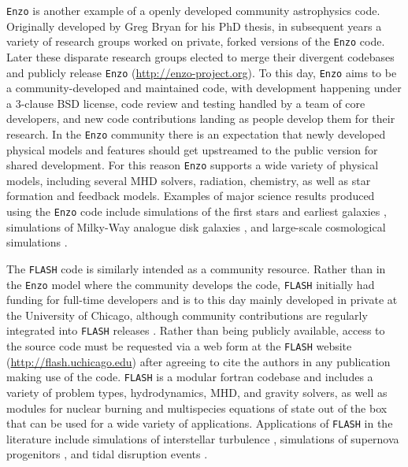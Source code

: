 \documentclass[11pt,twoside]{article}
\begin{document}
\texttt{Enzo} \citep{bryan2014} is another example of a openly developed community astrophysics code. Originally developed by Greg Bryan for his PhD thesis, in subsequent years a variety of research groups worked on private, forked versions of the \texttt{Enzo} code. Later these disparate research groups elected to merge their divergent codebases and publicly release \texttt{Enzo} (\url{http://enzo-project.org}). To this day, \texttt{Enzo} aims to be a community-developed and maintained code, with development happening under a 3-clause BSD license, code review and testing handled by a team of core developers, and new code contributions landing as people develop them for their research. In the \texttt{Enzo} community there is an expectation that newly developed physical models and features should get upstreamed to the public version for shared development. For this reason \texttt{Enzo} supports a wide variety of physical models, including several MHD solvers, radiation, chemistry, as well as star formation and feedback models. Examples of major science results produced using the \texttt{Enzo} code include simulations of the first stars \citep{abel2002} and earliest galaxies \citep{wise2012}, simulations of Milky-Way analogue disk galaxies \citep{goldbaum2016}, and large-scale cosmological simulations \citep{xu2016}.

The \texttt{FLASH} code \citep{fryxell2000} is similarly intended as a community resource. Rather than in the \texttt{Enzo} model where the community develops the code, \texttt{FLASH} initially had funding for full-time developers and is to this day mainly developed in private at the University of Chicago, although community contributions are regularly integrated into \texttt{FLASH} releases \citep{dubey2013}. Rather than being publicly available, access to the source code must be requested via a web form at the \texttt{FLASH} website (\url{http://flash.uchicago.edu}) after agreeing to cite the authors in any publication making use of the code. \texttt{FLASH} is a modular fortran codebase and includes a variety of problem types, hydrodynamics, MHD, and gravity solvers, as well as modules for nuclear burning and multispecies equations of state out of the box that can be used for a wide variety of applications. Applications of \texttt{FLASH} in the literature include simulations of interstellar turbulence \citep{federrath2013}, simulations of supernova progenitors \citep{couch2014}, and tidal disruption events \citep{guillochon2013}.
\end{document}
